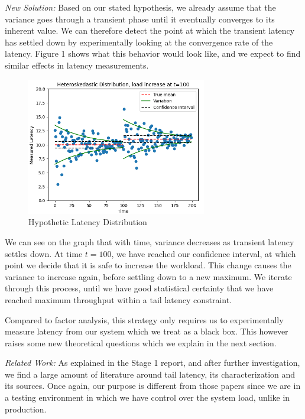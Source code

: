 \documentclass[12pt]{article}
\begin{document}
\noindent \textit{New Solution:} Based on our stated hypothesis, we already assume that the variance goes through a transient phase until it eventually converges to its inherent value. We can therefore detect the point at which the transient latency has settled down by experimentally looking at the convergence rate of the latency. Figure 1 shows what this behavior would look like, and we expect to find similar effects in latency measurements. 

\clearpage
\begin{figure}[H]
  \centering
  \includegraphics[width=0.7\textwidth]{distrib.png}
  \caption{Hypothetic Latency Distribution}
  \label{fig:sample}
\end{figure}

\noindent We can see on the graph that with time, variance decreases as transient latency settles down. At time $t=100$, we have reached our confidence interval, at which point we decide that it is safe to increase the workload. This change causes the variance to increase again, before settling down to a new maximum. We iterate through this process, until we have good statistical certainty that we have reached maximum throughput within a tail latency constraint. 

\noindent Compared to factor analysis, this strategy only requires us to experimentally measure latency from our system which we treat as a black box. This however raises some new theoretical questions which we explain in the next section.

\singlespacing

\noindent \textit{Related Work:} As explained in the Stage 1 report, and after further investigation, we find a large amount of literature around tail latency, its characterization and its sources. Once again, our purpose is different from those papers since we are in a testing environment in which we have control over the system load, unlike in production.
\end{document}
